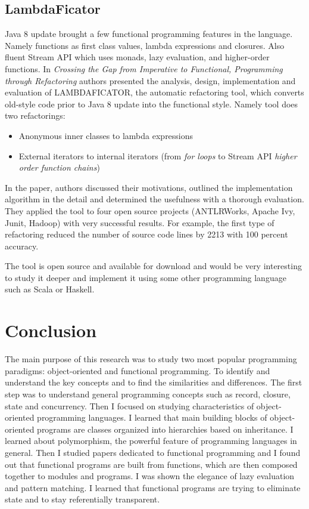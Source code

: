 \documentclass[12pt,twoside,a4paper]{report}
\begin{document}
\subsection{LambdaFicator}\label{2.5.3}
Java 8 update brought a few functional programming features in the language. Namely functions as first class values, lambda expressions and closures. Also fluent Stream API which uses monads, lazy evaluation, and higher-order functions. In \emph{Crossing the Gap from Imperative to Functional, Programming through Refactoring}\cite{15} authors presented the analysis, design, implementation and evaluation of LAMBDAFICATOR, the automatic refactoring tool, which converts old-style code prior to Java 8 update into the functional style. Namely tool does two refactorings:
\begin{itemize}\itemsep1pt \parskip0pt 
\item Anonymous inner classes to lambda expressions
\item External iterators to internal iterators (from \textit{for loops} to Stream API \textit{higher order function chains})
\end{itemize}
In the paper, authors discussed their motivations, outlined the implementation algorithm in the detail and determined the usefulness with a thorough evaluation. They applied the tool to four open source projects (ANTLRWorks, Apache Ivy, Junit, Hadoop) with very successful results. For example, the first type of refactoring reduced the number of source code lines by 2213 with 100 percent accuracy.\par
The tool is open source and available for download and would be very interesting to study it deeper and implement it using some other programming language such as Scala or Haskell.

\section{Conclusion}\label{2.6}
The main purpose of this research was to study two most popular programming paradigms: object-oriented and functional programming. To identify and understand the key concepts and to
find the similarities and differences. The first step was to understand general programming concepts such as record, closure, state and concurrency. Then I focused on studying characteristics of object-oriented programming languages. I learned that main building blocks of object-oriented programs are classes organized into hierarchies based on inheritance. I learned about polymorphism, the powerful feature of programming languages in general. Then I studied papers dedicated to functional programming and I found out that functional programs are built from functions, which are then composed together to modules and programs. I was shown the elegance of lazy evaluation and pattern matching. I learned that functional programs are trying to eliminate state and to stay referentially transparent.
\end{document}
